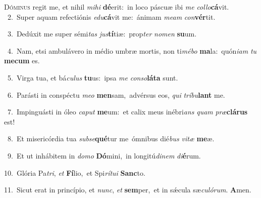 \lettrine{\initial\textcolor{\initialcolor}{D}}{óminus} regit me, et nihil \textit{mi}\-\textit{hi} \textbf{dé}\-erit:~\star in loco páscuæ ibi \textit{me} \textit{col}\-\textit{lo}\textbf{cá}vit.\\
{\numbfont\textcolor{\numbcolor}{~2.}}~Super aquam refectiónis \textit{e}\-\textit{du}\textbf{cá}vit me:~\star ánimam \textit{me}\-\textit{am} \textit{con}\-\textbf{vér}tit.\par
{\numbfont\textcolor{\numbcolor}{~3.}}~Dedúxit me super sémi\textit{tas} \textit{jus}\-\textbf{tí}tiæ:~\star prop\textit{ter} \textit{no}\-\textit{men} \textbf{su}\-um.\par
{\numbfont\textcolor{\numbcolor}{~4.}}~Nam, etsi ambulávero in médio umbræ mortis, non ti\-\textit{mé}\-\textit{bo} \textbf{ma}\-la:~\star quón\-\textit{i}\-\textit{am} \textit{tu} \textbf{me}\-\textbf{cum} es.\par
{\numbfont\textcolor{\numbcolor}{~5.}}~Virga tua, et bá\-\textit{cu}\-\textit{lus} \textbf{tu}\-us:~\star ipsa \textit{me} \textit{con}\-\textit{so}\textbf{lá}\textbf{ta} sunt.\par
{\numbfont\textcolor{\numbcolor}{~6.}}~Parásti in conspéctu \textit{me}\-\textit{o} \textbf{men}\-sam,~\star advérsus eos, \textit{qui} \textit{trí}\-\textit{bu}\textbf{lant} me.\par
{\numbfont\textcolor{\numbcolor}{~7.}}~Impinguásti in óleo \textit{ca}\-\textit{put} \textbf{me}\-um:~\star et calix meus inébri\textit{ans} \textit{quam} \textit{præ}\-\textbf{clá}\textbf{rus} est!\par
{\numbfont\textcolor{\numbcolor}{~8.}}~Et misericórdia tua \textit{sub}\-\textit{se}\textbf{qué}tur me~\star ómnibus dié\textit{bus} \textit{vi}\-\textit{tæ} \textbf{me}\-æ.\par
{\numbfont\textcolor{\numbcolor}{~9.}}~Et ut inhábitem in \textit{do}\-\textit{mo} \textbf{Dó}\-mini,~\star in longitú\-\textit{di}\-\textit{nem} \textit{di}\-\textbf{é}rum.\par
{\numbfont\textcolor{\numbcolor}{10.}}~Glória Pa\-\textit{tri}\-, \textit{et} \textbf{Fí}\-lio,~\star et Spi\-\textit{rí}\-\textit{tu}\textit{i} \textbf{Sanc}\-to.\par
{\numbfont\textcolor{\numbcolor}{11.}}~Sicut erat in princípio, et \textit{nunc}\-, \textit{et} \textbf{sem}\-per,~\star et in sǽcula sæ\-\textit{cu}\-\textit{ló}\textit{rum}. \textbf{A}\-men.\par
